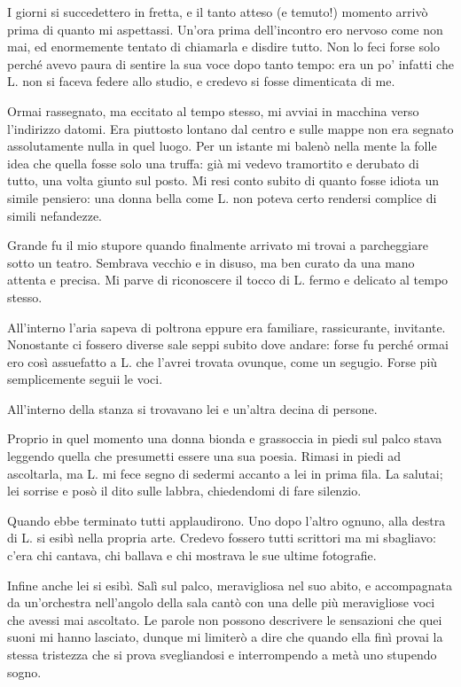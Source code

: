 \documentclass[a4paper,12pt]{book}
\begin{document}
I giorni si succedettero in fretta, e il tanto atteso (e temuto!) momento
arrivò prima di quanto mi aspettassi. Un'ora prima dell'incontro ero nervoso
come non mai, ed enormemente tentato di chiamarla e disdire tutto. Non lo feci
forse solo perché avevo paura di sentire la sua voce dopo tanto tempo: era un
po' infatti che L. non si faceva federe allo studio, e credevo si fosse
dimenticata di me.

Ormai rassegnato, ma eccitato al tempo stesso, mi avviai in macchina verso
l'indirizzo datomi. Era piuttosto lontano dal centro e sulle mappe non era
segnato assolutamente nulla in quel luogo. Per un istante mi balenò nella mente
la folle idea che quella fosse solo una truffa: già mi vedevo tramortito e
derubato di tutto, una volta giunto sul posto. Mi resi conto subito di quanto
fosse idiota un simile pensiero: una donna bella come L. non poteva certo
rendersi complice di simili nefandezze.

Grande fu il mio stupore quando finalmente arrivato mi trovai a parcheggiare
sotto un teatro. Sembrava vecchio e in disuso, ma ben curato da una mano attenta
e precisa. Mi parve di riconoscere il tocco di L. fermo e delicato al tempo
stesso.

All'interno l'aria sapeva di poltrona eppure era familiare, rassicurante,
invitante. Nonostante ci fossero diverse sale seppi subito dove andare: forse fu
perché ormai ero così assuefatto a L. che l'avrei trovata ovunque, come un
segugio. Forse più semplicemente seguii le voci.

All'interno della stanza si trovavano lei e un'altra decina di persone.

Proprio in quel momento una donna bionda e grassoccia in piedi sul palco stava
leggendo quella che presumetti essere una sua poesia. Rimasi in piedi ad
ascoltarla, ma L. mi fece segno di sedermi accanto a lei in prima fila. La
salutai; lei sorrise e posò il dito sulle labbra, chiedendomi di fare silenzio.

Quando ebbe terminato tutti applaudirono. Uno dopo l'altro ognuno, alla destra
di L. si esibì nella propria arte. Credevo fossero tutti scrittori ma mi
sbagliavo: c'era chi cantava, chi ballava e chi mostrava le sue ultime
fotografie.

Infine anche lei si esibì. Salì sul palco, meravigliosa nel suo abito, e
accompagnata da un'orchestra nell'angolo della sala cantò con una delle
più meravigliose voci che avessi mai ascoltato. Le parole non possono
descrivere le sensazioni che quei suoni mi hanno lasciato, dunque mi limiterò a
dire che quando ella finì provai la stessa tristezza che si prova svegliandosi e
interrompendo a metà uno stupendo sogno.
\end{document}
